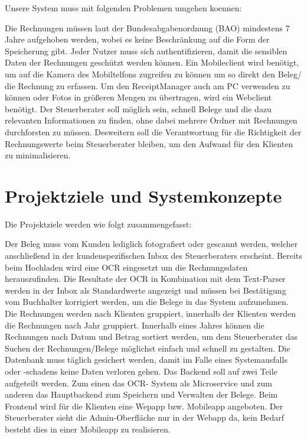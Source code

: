 \documentclass[12pt]{article}
\theoremstyle{definition}
\begin{document}
Unsere System muss mit folgenden Problemen umgehen koennen:
\begin{itemize}
Die Rechnungen müssen laut der Bundesabgabenordnung (BAO) mindestens 7 Jahre aufgehoben werden, wobei es keine Beschränkung auf die Form der Speicherung gibt.
Jeder Nutzer muss sich authentifizieren, damit die sensiblen Daten der Rechnungen geschützt werden können.
Ein Mobileclient wird benötigt, um auf die Kamera des Mobiltelfons zugreifen zu können um so direkt den Beleg/ die Rechnung zu erfassen. Um den ReceiptManager auch am PC verwenden zu können oder Fotos in größeren Mengen zu übertragen, wird ein Webclient benötigt.
Der Steuerberater soll möglich sein, schnell Belege und die dazu relevanten Informationen zu finden, ohne dabei mehrere Ordner mit Rechnungen durchforsten zu müssen.
Desweitern soll die Verantwortung für die Richtigkeit der Rechnungswerte beim Steuerberater bleiben, um den Aufwand für den Klienten zu minimalisieren.
\end{itemize}

\pagebreak

\section{Projektziele und Systemkonzepte}
Die Projektziele werden wie folgt zusammengefasst:
\begin{itemize}
Der Beleg muss vom Kunden lediglich fotografiert oder gescannt werden, welcher anschließend in der kundenspezifischen Inbox des Steuerberaters erscheint. Bereits beim Hochladen wird eine OCR eingesetzt um die Rechnungsdaten herauszufinden. Die Resultate der OCR in Kombination mit dem Text-Parser werden in der Inbox als Standardwerte angezeigt und müssen bei Bestätigung vom Buchhalter korrigiert werden, um die Belege in das System aufzunehmen.
Die Rechnungen werden nach Klienten gruppiert, innerhalb der Klienten werden die Rechnungen nach Jahr gruppiert. Innerhalb eines Jahres können die Rechnungen nach Datum und Betrag sortiert werden, um dem Steuerberater das Suchen der Rechnungen/Belege möglichst einfach und schnell zu gestalten.
Die Datenbank muss täglich gesichert werden, damit im Falle eines Systemausfalls oder -schadens keine Daten verloren gehen. 
Das Backend soll auf zwei Teile aufgeteilt werden. Zum einen das OCR- System als Microservice und zum anderen das Hauptbackend zum Speichern und Verwalten der Belege.
Beim Frontend wird für die Klienten eine Wepapp bzw. Mobileapp angeboten. Der Steuerberater sieht die Admin-Oberfläche nur in der Webapp da, kein Bedarf besteht dies in einer Mobileapp zu realisieren.
\end{itemize}
\end{document}
